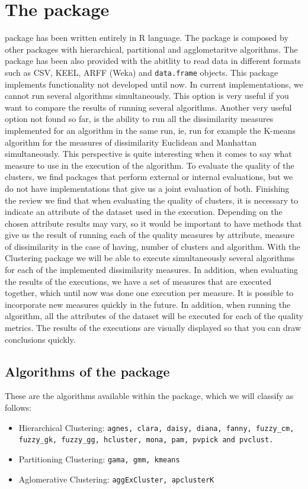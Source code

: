 \section {The  package} \label{sec:seccion3}
 package has been written entirely in R language. The package is composed by other packages with hierarchical, partitional and agglometaritve algorithms. The package has been also provided with the abitlity to read data in different formats such as CSV, KEEL, ARFF (Weka) and \texttt{data.frame} objects. This package implements functionality not developed until now. In current implementations, we cannot run several algorithms simultaneously. This option is very useful if you want to compare the results of running several algorithms. Another very useful option not found so far, is the ability to run all the dissimilarity measures implemented for an algorithm in the same run, ie, run for example the K-means algorithm for the measures of dissimilarity Euclidean and Manhattan simultaneously. This perspective is quite interesting when it comes to say what measure to use in the execution of the algorithm. To evaluate the quality of the clusters, we find packages that perform external or internal evaluations, but we do not have implementations that give us a joint evaluation of both. Finishing the review we find that when evaluating the quality of clusters, it is necessary to indicate an attribute of the dataset used in the execution. Depending on the chosen attribute results may vary, so it would be important to have methods that give us the result of running each of the quality measures by attribute, measure of dissimilarity in the case of having, number of clusters and algorithm. With the Clustering package we will be able to execute simultaneously several algorithms for each of the implemented dissimilarity measures. In addition, when evaluating the results of the executions, we have a set of measures that are executed together, which until now was done one execution per measure. It is possible to incorporate new measures quickly in the future. In addition, when running the algorithm, all the attributes of the dataset will be executed for each of the quality metrics. The results of the executions are visually displayed so that you can draw conclusions quickly.

\subsection{Algorithms of the package}
These are the algorithms available within the package, which we will classify as follows:
\begin{itemize}
  \item Hierarchical Clustering: \texttt{agnes, clara, daisy, diana, fanny, fuzzy\_cm, fuzzy\_gk, fuzzy\_gg, hcluster, mona, pam, pvpick and pvclust.}
  \item Partitioning Clustering: \texttt{gama, gmm, kmeans}
  \item Aglomerative Clustering: \texttt{aggExCluster, apclusterK}
\end{itemize}

